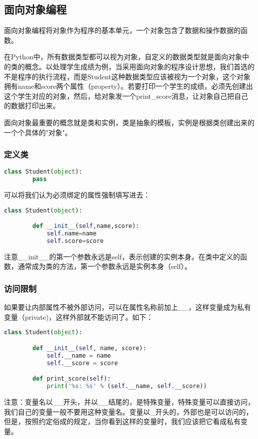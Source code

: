 \documentclass[12pt,a4paper]{article}
\begin{document}
\begin{CJK}{UTF8}{gbsn}
    \subsection{面向对象编程}
    面向对象编程将对象作为程序的基本单元，一个对象包含了数据和操作数据的函数。

    在Python中，所有数据类型都可以视为对象，自定义的数据类型就是面向对象中的类的概念。以处理学生成绩为例，当采用面向对象的程序设计思想，我们首选的不是程序的执行流程，而是Student这种数据类型应该被视为一个对象，这个对象拥有name和score两个属性（property）。若要打印一个学生的成绩，必须先创建出这个学生对应的对象，然后，给对象发一个print\_score消息，让对象自己把自己的数据打印出来。

    面向对象最重要的概念就是类和实例，类是抽象的模板，实例是根据类创建出来的一个个具体的"对象"。

    \subsubsection{定义类}
    \begin{lstlisting}[language=python]
    class Student(object):
        pass
    \end{lstlisting}
    可以将我们认为必须绑定的属性强制填写进去：
    \begin{lstlisting}[language=python]
    class Student(object):

        def __init__(self,name,score):
            self.name=name
            self.score=score
    \end{lstlisting}
    注意\_\_init\_\_的第一个参数永远是self，表示创建的实例本身。在类中定义的函数，通常成为类的方法，第一个参数永远是实例本身（self）。
    \subsubsection{访问限制}
    如果要让内部属性不被外部访问，可以在属性名称前加上\_\_，这样变量成为私有变量（private)，这样外部就不能访问了。如下：
    \begin{lstlisting}[language=python]
    class Student(object):

        def __init__(self, name, score):
            self.__name = name
            self.__score = score

        def print_score(self):
            print('%s: %s' % (self.__name, self.__score))
    \end{lstlisting}
    注意：变量名以\_\_开头，并以\_\_结尾的，是特殊变量，特殊变量可以直接访问，我们自己的变量一般不要用这种变量名。变量以\_开头的，外部也是可以访问的，但是，按照约定俗成的规定，当你看到这样的变量时，我们应该把它看成私有变量。

\end{CJK}
\end{document}
